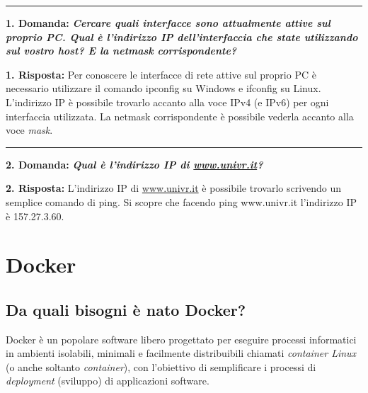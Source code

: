 \documentclass[a4paper]{article}
\newcommand{\longline}{\noindent\rule{\textwidth}{0.4pt}}
\begin{document}
	\longline\newline
	
	\noindent
	\textcolor{Red3}{\textbf{1. Domanda:}} \textbf{\emph{Cercare quali interfacce sono attualmente attive sul proprio PC. Qual è l'indirizzo IP dell'interfaccia che state utilizzando sul vostro host? E la netmask corrispondente?}}\newline
	
	\noindent
	\textcolor{Green4}{\textbf{1. Risposta:}} Per conoscere le interfacce di rete attive sul proprio PC è necessario utilizzare il comando \textsf{ipconfig} su Windows e \textsf{ifconfig} su Linux. L'indirizzo IP è possibile trovarlo accanto alla voce IPv4 (e IPv6) per ogni interfaccia utilizzata. La netmask corrispondente è possibile vederla accanto alla voce \emph{mask}.
	
	\longline\newline
	
	\noindent
	\textcolor{Red3}{\textbf{2. Domanda:}} \textbf{\emph{Qual è l'indirizzo IP di \url{www.univr.it}?}}\newline
	
	\noindent
	\textcolor{Green4}{\textbf{2. Risposta:}} L'indirizzo IP di \url{www.univr.it} è possibile trovarlo scrivendo un semplice comando di \textsf{ping}. Si scopre che facendo \textsf{ping www.univr.it} l'indirizzo IP è 157.27.3.60.\newpage
	
	\section{Docker}
	
	\subsection{Da quali bisogni è nato Docker?}
	
	Docker è un popolare software libero progettato per eseguire processi informatici in ambienti isolabili, minimali e facilmente distribuibili chiamati \emph{container Linux} (o anche soltanto \emph{container}), con l'obiettivo di semplificare i processi di \emph{deployment} (sviluppo) di applicazioni software.\newline
	
\end{document}
